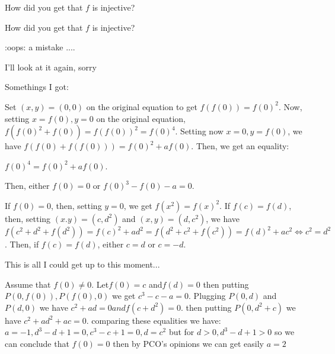 \begin{solution}
	How did you get that $f$ is injective?
\end{solution}



\begin{solution}
	\begin{tcolorbox}How did you get that $f$ is injective?\end{tcolorbox}
:oops: a mistake ....

I'll look at it again, sorry
\end{solution}



\begin{solution}
	Somethings I got:

Set $(x,y)=(0,0)$ on the original equation to get $f(f(0))=f(0)^2$. Now, setting $x=f(0),y=0$ on the original equation, $f(f(0)^2+f(0))=f(f(0))^2=f(0)^4$. Setting now $x=0, y=f(0)$, we have $f(f(0)+f(f(0)))=f(0)^2+af(0)$. Then, we get an equality: 

$f(0)^4 = f(0)^2 + af(0)$. 

Then, either $f(0)=0$ or $f(0)^3 - f(0) - a=0$.

If $f(0)=0$, then, setting $y=0$, we get $f(x^2)=f(x)^2$. If $f(c)=f(d)$, then, setting $(x.y)=(c,d^2)$ and $(x,y)=(d,c^2)$, we have $f(c^2+d^2+f(d^2))=f(c)^2 + ad^2 = f(d^2+c^2+f(c^2))=f(d)^2 + ac^2 \iff c^2 = d^2$. Then, if $f(c)=f(d)$, either $c=d$ or $c=-d$. 

This is all I could get up to this moment...
\end{solution}



\begin{solution}
	Assume that $f(0)\neq0$. Let$f(0)=c$ and$f(d)=0$ then putting $P(0,f(0)),P(f(0),0)$ we get $c^3-c-a=0$. Plugging $P(0,d)$ and  $P(d,0)$ we have $c^2+ad=0 and f(c+d^2)=0$. then putting $P(0,d^2+c)$ we have  $c^2+ad^2+ac=0$.   comparing  these equalities we have: $a=-1,d^3-d+1=0,c^3-c+1=0,d=c^2$ but for $d>0, d^3-d+1>0$ so we can conclude that $f(0)=0$ then by PCO's opinions we can get easily $a=2$
\end{solution}



